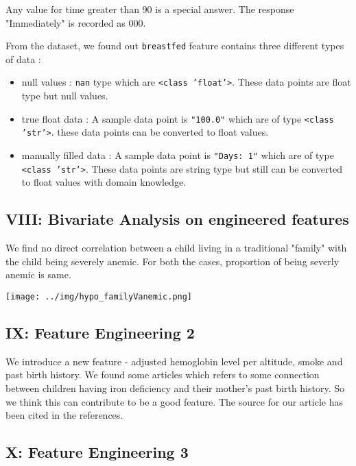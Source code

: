Any value for time greater than 90 is a special answer. The response "Immediately" is recorded as 000.

From the dataset, we found out \texttt{breastfed} feature contains three different types of data :

\begin{itemize}
    \item null values : \texttt{nan} type which are \texttt{<class 'float'>}. These data points are float type but null values.
    \item true float data : A sample data point is \texttt{"100.0"} which are of type \texttt{<class 'str'>}. these data points can be converted to float values.
    \item manually filled data : A sample data point is \texttt{"Days: 1"} which are of type \texttt{<class 'str'>}. These data points are string type but still can be converted to float values with domain knowledge.
\end{itemize}





\subsection{VIII: Bivariate Analysis on engineered features}

We find no direct correlation between a child living in a traditional "family" with the child being severely anemic. For both the cases, proportion of being severly anemic is same.

\texttt{[image: ../img/hypo\_familyVanemic.png]}



\subsection{IX: Feature Engineering 2}

We introduce a new feature - adjusted hemoglobin level per altitude, smoke and past birth history. We found some articles which refers to some connection between children having iron deficiency and their mother's past birth history. So we think this can contribute to be a good feature. The source for our article has been cited in the references.




\subsection{X: Feature Engineering 3}


